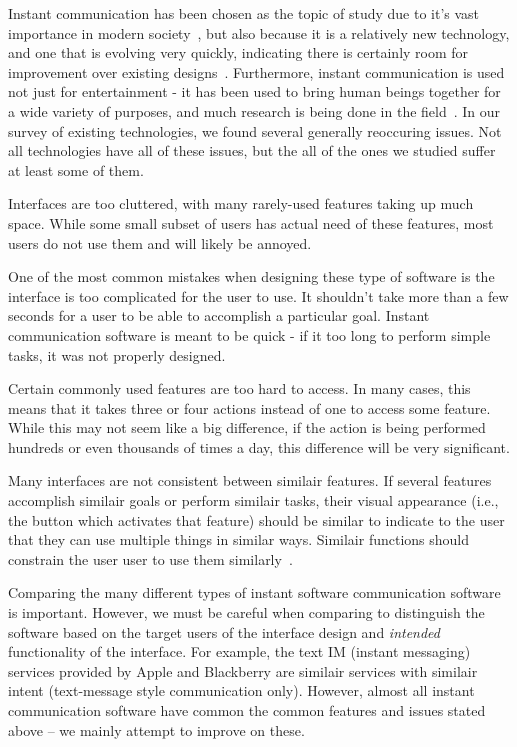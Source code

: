 \documentclass{sigchi}
\begin{document}
Instant communication has been chosen as the topic of study due to it's vast
importance in modern society~\cite[p. 15]{coyle:Social_networking}, but also
because it is a relatively new technology, and one that is evolving very
quickly, indicating there is certainly room for improvement over existing
designs~\cite[p. 9]{BUHALIS:tourism}. Furthermore, instant communication is used
not just for entertainment - it has been used to bring human beings together for
a wide variety of purposes, and much research is being done in the
field~\cite{Voida:interview, Smale:broadcast, Jiang:task_chat,Birnholtz:OpenMessenger, Motoyama:CrossTalk}. In our survey
of existing technologies, we found several generally reoccuring issues.  Not all
technologies have all of these issues, but the all of the ones we studied suffer
at least some of them.

Interfaces are too cluttered, with many rarely-used features taking up much space. 
While some small subset of users has actual need of these features, most users do not 
use them and will likely be annoyed. 

One of the most common mistakes when designing these type of software is the
interface is too complicated for the user to use. It shouldn't take more than a
few seconds for a user to be able to accomplish a particular goal. Instant
communication software is meant to be quick - if it too long to perform simple
tasks, it was not properly designed.

Certain commonly used features are too hard to access. In many cases, this means
that it takes three or four actions instead of one to access some feature. While this may
not seem like a big difference, if the action is being performed hundreds or
even thousands of times a day, this difference will be very significant. 

Many interfaces are not consistent between similair features. If several features
accomplish similair goals or perform similair tasks, their visual appearance 
(i.e., the button which activates that feature) should be similar to indicate 
to the user that they can use multiple things in similar ways. Similair functions
should constrain the user user to use them similarly~\cite[p. 125]{Norman:DET}.

Comparing the many different types of instant software communication software is
important. However, we must be careful when comparing to distinguish the
software based on the target users of the interface design and \emph{intended}
functionality of the interface. For example, the text IM (instant messaging)
services provided by Apple and Blackberry are similair services with similair
intent (text-message style communication only). However, almost all instant
communication software have common the common features and issues stated above
-- we mainly attempt to improve on these.
\end{document}
